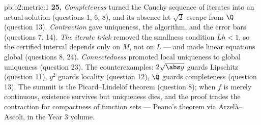 \begin{solution}{pb:b2:metric:1}
\textbf{25.} \emph{Completeness} turned the Cauchy sequence of
iterates into an actual solution (questions 1, 6, 8), and its
absence let $\sqrt2$ escape from $\Q$ (question 13).
\emph{Contraction} gave uniqueness, the algorithm, and the
error bars (questions 7, 14). \emph{The iterate trick} removed
the smallness condition $Lh < 1$, so the certified interval
depends only on $M$, not on $L$ --- and made linear equations
global (questions 8, 24). \emph{Connectedness} promoted local
uniqueness to global uniqueness (question 23). The
counterexamples: $2\sqrt{\abs y}$ guards Lipschitz (question
11), $y^2$ guards locality (question 12), $\Q$ guards
completeness (question 13). The summit is the
Picard--Lindel\"of theorem (question 8); when $f$ is merely
continuous, existence survives but uniqueness dies, and the
proof trades the contraction for compactness of function sets
--- Peano's theorem via Arzel\`a--Ascoli, in the Year 3
volume.
\end{solution}
